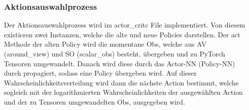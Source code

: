 \subsubsection{Aktionsauswahlprozess} \label{sec:Impl_PPO_Aktionsauswahlprozess}
Der Aktionsauswahlprozess wird im actor\_critc File implementiert. Von diesem existieren zwei Instanzen, welche die alte und neue Policies darstellen. Der act Methode der alten Policy wird die momentane Obs, welche aus AV (around\_view) und SO (scalar\_obs) besteht, übergeben und zu PyTorch Tensoren umgewandelt. Danach wird diese durch das Actor-NN (Policy-NN) durch propagiert, sodass eine Policy übergeben wird. Auf dieser Wahrscheinlichkeitsverteilung wird dann die nächste Action bestimmt, welche sogleich mit der logarithmierten Wahrscheinlichkeiten der ausgewählten Action und der zu Tensoren umgewandelten Obs, ausgegeben wird.

